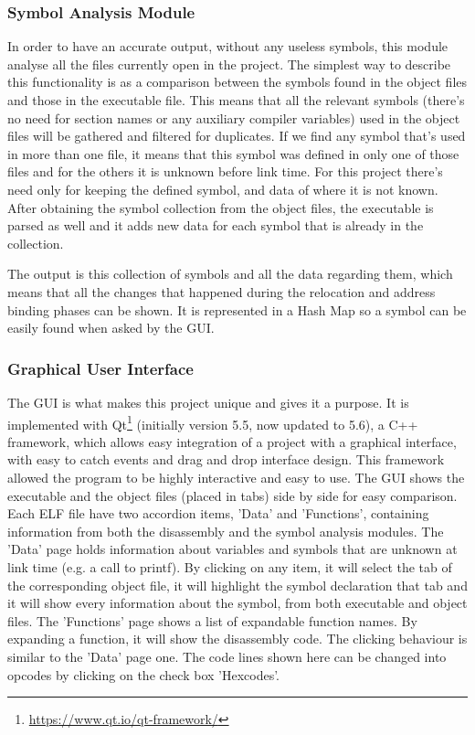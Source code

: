 \subsubsection{Symbol Analysis Module}
\label{sub-sec:sym-mod}

In order to have an accurate output, without any useless symbols, this module analyse all the files currently open in the project. The simplest way to describe this functionality is as a comparison between the symbols found in the object files and those in the executable file. This means that all the relevant symbols (there's no need for section names or any auxiliary compiler variables) used in the object files will be gathered and filtered for duplicates. If we find any symbol that's used in more than one file, it means that this symbol was defined in only one of those files and for the others it is unknown before link time. For this project there's need only for keeping the defined symbol, and data of where it is not known. After obtaining the symbol collection from the object files, the executable is parsed as well and it adds new data for each symbol that is already in the collection.

The output is this collection of symbols and all the data regarding them, which means that all the changes that happened during the relocation and address binding phases can be shown. It is represented in a Hash Map so a symbol can be easily found when asked by the GUI.

\subsubsection{Graphical User Interface}
\label{sub-sec:gui-mod}

The GUI is what makes this project unique and gives it a purpose. It is implemented with Qt\footnote{\url{https://www.qt.io/qt-framework/}} (initially version 5.5, now updated to 5.6), a C++ framework, which allows easy integration of a project with a graphical interface, with easy to catch events and drag and drop interface design. This framework allowed the program to be highly interactive and easy to use. The GUI shows the executable and the object files (placed in tabs) side by side for easy comparison. Each ELF file have two accordion items, 'Data' and 'Functions', containing information from both the disassembly and the symbol analysis modules. The 'Data' page holds information about variables and symbols that are unknown at link time (e.g. a call to printf). By clicking on any item, it will select the tab of the corresponding object file, it will highlight the symbol declaration that tab and it will show every information about the symbol, from both executable and object files. The 'Functions' page shows a list of expandable function names. By expanding a function, it will show the disassembly code. The clicking behaviour is similar to the 'Data' page one. The code lines shown here can be changed into opcodes by clicking on the check box 'Hexcodes'.

